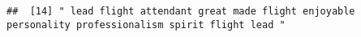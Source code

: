 \documentclass[
]{article}
\begin{document}
\begin{verbatim}
##  [14] " lead flight attendant great made flight enjoyable personality professionalism spirit flight lead "                                                                                                                                                                                                                                                                                                                                                                                                                                                                                                                                                                                                                                                                                                                                                                                                                                                                                                                                                                                                                                                                                                                                                                                                                                                                                                                                                                                                                                                                                                                                                                                                                                                                                            

\end{verbatim}
\end{document}
